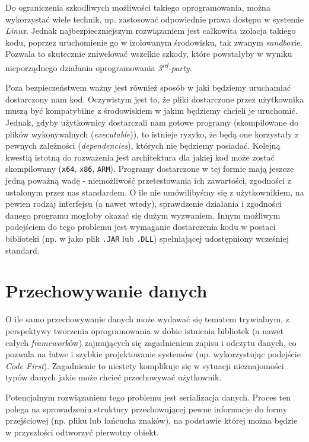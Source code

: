 \par Do ograniczenia szkodliwych możliwości takiego oprogramowania, można wykorzystać wiele technik, np. zastosować odpowiednie prawa dostępu w systemie \emph{Linux}. Jednak najbezpieczniejszym rozwiązaniem jest całkowita izolacja takiego kodu, poprzez uruchomienie go w izolowanym środowisku, tak zwanym \emph{sandbox}ie. Pozwala to skutecznie zniwelować wszelkie szkody, które powstałyby w wyniku nieporządnego działania oprogramowania \emph{3\textsuperscript{rd}-party}.

\par Poza bezpieczeństwem ważny jest również sposób w jaki będziemy uruchamiać dostarczony nam kod. Oczywistym jest to, że pliki dostarczone przez użytkownika muszą być kompatybilne z środowiskiem w jakim będziemy chcieli je uruchomić. Jednak, gdyby użytkownicy dostarczali nam gotowe programy (skompilowane do plików wykonywalnych (\emph{executable})), to istnieje ryzyko, że będą one korzystały z pewnych zależności (\emph{dependencies}), których nie będziemy posiadać. Kolejną kwestią istotną do rozważenia jest architektura dla jakiej kod może zostać skompilowany (\texttt{x64}, \texttt{x86}, \texttt{ARM}). Programy dostarczone w tej formie mają jeszcze jedną poważną wadę - niemożliwość przetestowania ich zawartości, zgodności z ustalonym przez nas standardem. O ile nie umówilibyśmy się z użytkownikiem, na pewien rodzaj interfejsu (a nawet wtedy), sprawdzenie działania i zgodności danego programu mogłoby okazać się dużym wyzwaniem. Innym możliwym podejściem do tego problemu jest wymaganie dostarczenia kodu w postaci biblioteki (np. w jako plik \texttt{.JAR} lub \texttt{.DLL}) spełniającej udostępniony wcześniej standard.

\section{Przechowywanie danych}

\par O ile samo przechowywanie danych może wydawać się tematem trywialnym, z perspektywy tworzenia oprogramowania w dobie istnienia bibliotek (a nawet całych \emph{framework}ów) zajmujących się zagadnieniem zapisu i odczytu danych, co pozwala na łatwe i szybkie projektowanie systemów (np. wykorzystując podejście \emph{Code First}). Zagadnienie to niestety komplikuje się w sytuacji nieznajomości typów danych jakie może chcieć przechowywać użytkownik.

\par Potencjalnym rozwiązaniem tego problemu jest serializacja danych. Proces ten polega na sprowadzeniu struktury przechowującej pewne informacje do formy przejściowej (np. pliku lub łańcucha znaków), na podstawie której można będzie w przyszłości odtworzyć pierwotny obiekt.

